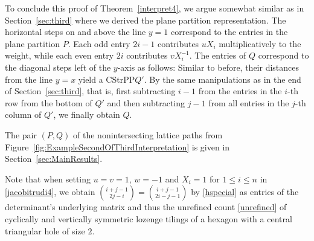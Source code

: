 \documentclass[12pt]{amsart}
\theoremstyle{definition}
\numberwithin{equation}{section}
\newcommand{\CSPP}{CStrPP\xspace}
\begin{document}
To conclude this proof of Theorem~\ref{interpret4}, we argue somewhat similar as in Section~\ref{sec:third} where we derived the plane partition representation. The horizontal steps on and above the line $y=1$ correspond to the entries in the plane partition $P$. Each odd entry $2i-1$ contributes $u X_i$ multiplicatively to the weight, while each even entry $2i$ contributes $v X_i^{-1}$. The entries of $Q$ correspond to the diagonal steps left of the $y$-axis as follows: Similar to before, their distances from the line $y=x$ yield a \CSPP $Q'$. By the same manipulations as in the end of Section~\ref{sec:third}, that is, first subtracting $i-1$ from the entries in the $i$-th row from the bottom of $Q'$ and then subtracting $j-1$ from all entries in the $j$-th column of $Q'$, we finally obtain $Q$.

The pair $(P,Q)$ of the nonintersecting lattice paths from Figure~\ref{fig:ExampleSecondOfThirdInterpretation} is given in Section~\ref{sec:MainResults}. 

Note that when setting $u=v=1$, $w=-1$ and $X_i=1$ for $1 \le i \le n$ in \eqref{jacobitrudi4}, we obtain $\binom{i+j-1}{2j-i}=\binom{i+j-1}{2i-j-1}$ by \eqref{hspecial}  as entries of the determinant's underlying matrix and 
thus the unrefined count \eqref{unrefined} of cyclically and vertically symmetric lozenge tilings of a hexagon with a central triangular hole of size $2$.  



\end{document}
